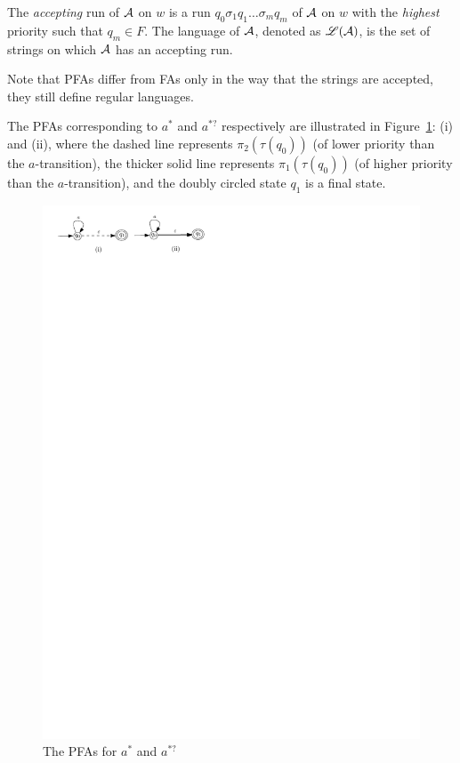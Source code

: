 The \emph{accepting} run of $\mathcal{A}$ on $w$ is a run $q_0 \sigma_1 q_1 \ldots \sigma_m q_m$ of $\mathcal{A}$ on $w$ with the \emph{highest} priority such that $q_m \in F$. The language of $\mathcal{A}$, denoted as $\mathscr{L}(\mathcal{A})$, is the set of
 strings on which $\mathcal{A}$ has an accepting run.


Note that PFAs differ from FAs only in the way that the strings are accepted, they still define regular languages. 

\begin{example}
The PFAs corresponding to $a^\ast$ and $a^{\ast?}$ respectively are illustrated in Figure~\ref{fig-pfa}: (i) and (ii), where the dashed line represents $\pi_2(\tau(q_0))$ (of lower priority than the $a$-transition), the thicker solid line represents $\pi_1(\tau(q_0))$ (of higher priority than the $a$-transition), and the doubly circled state $q_1$ is a final state.

\begin{figure}[ht]
\centering
\includegraphics[scale=0.8]{pfa.pdf}
\caption{The PFAs for $a^\ast$ and $a^{\ast?}$}
\label{fig-pfa}
\end{figure}

\end{example}

